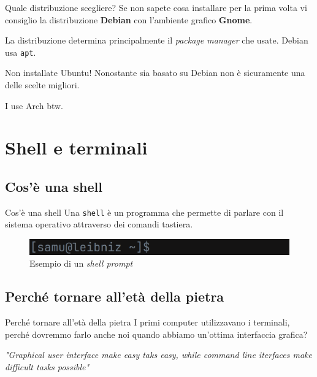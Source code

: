 \documentclass{beamer}
\begin{document}
\begin{frame}{Quale distribuzione scegliere?}
  Se non sapete cosa installare per la prima volta vi consiglio la distribuzione
  \textbf{Debian} con l'ambiente grafico \textbf{Gnome}.\bigskip

  La distribuzione determina principalmente il \textit{package manager} che 
  usate. Debian usa \texttt{apt}.\bigskip

  Non installate Ubuntu! Nonostante sia basato su Debian non è sicuramente una
  delle scelte migliori.\bigskip

  I use Arch btw.
\end{frame}

\section{Shell e terminali}

\subsection{Cos'è una shell}
\begin{frame}{Cos'è una shell}
  Una \texttt{shell} è un programma che permette di parlare con il sistema 
  operativo attraverso dei comandi tastiera.
  \pause
  \begin{figure}
    \includegraphics[width=\textwidth]{assets/shell-prompt.png}
    \caption{Esempio di un \textit{shell prompt}}
  \end{figure}
\end{frame}

\subsection{Perché tornare all'età della pietra}
\begin{frame}{Perché tornare all'età della pietra}
  I primi computer utilizzavano i terminali, perché dovremmo farlo anche noi
  quando abbiamo un'ottima interfaccia grafica?\bigskip
  \pause

  \textit{"Graphical user interface make easy taks easy, while command line 
  iterfaces make difficult tasks possible"}
\end{frame}
\end{document}
